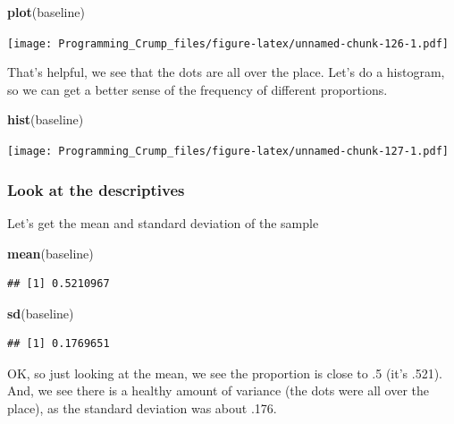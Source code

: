\documentclass[]{book}
\newenvironment{Shaded}{\begin{snugshade}}{\end{snugshade}}
\newcommand{\KeywordTok}[1]{\textcolor[rgb]{0.13,0.29,0.53}{\textbf{{#1}}}}
\newcommand{\NormalTok}[1]{{#1}}
\theoremstyle{definition}
\theoremstyle{definition}
\theoremstyle{definition}
\theoremstyle{remark}
\begin{document}
\begin{Shaded}
\begin{Highlighting}[]
\KeywordTok{plot}\NormalTok{(baseline)}
\end{Highlighting}
\end{Shaded}

\texttt{[image: Programming\_Crump\_files/figure-latex/unnamed-chunk-126-1.pdf]}

That's helpful, we see that the dots are all over the place. Let's do a
histogram, so we can get a better sense of the frequency of different
proportions.

\begin{Shaded}
\begin{Highlighting}[]
\KeywordTok{hist}\NormalTok{(baseline)}
\end{Highlighting}
\end{Shaded}

\texttt{[image: Programming\_Crump\_files/figure-latex/unnamed-chunk-127-1.pdf]}

\subsubsection{Look at the descriptives}\label{look-at-the-descriptives}

Let's get the mean and standard deviation of the sample

\begin{Shaded}
\begin{Highlighting}[]
\KeywordTok{mean}\NormalTok{(baseline)}
\end{Highlighting}
\end{Shaded}

\begin{verbatim}
## [1] 0.5210967
\end{verbatim}

\begin{Shaded}
\begin{Highlighting}[]
\KeywordTok{sd}\NormalTok{(baseline)}
\end{Highlighting}
\end{Shaded}

\begin{verbatim}
## [1] 0.1769651
\end{verbatim}

OK, so just looking at the mean, we see the proportion is close to .5
(it's .521). And, we see there is a healthy amount of variance (the dots
were all over the place), as the standard deviation was about .176.
\end{document}
